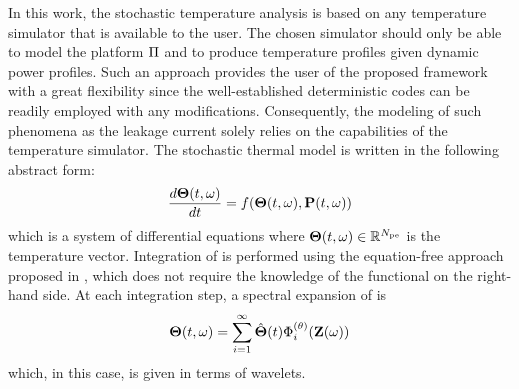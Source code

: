 In this work, the stochastic temperature analysis is based on any temperature simulator that is available to the user. The chosen simulator should only be able to model the platform $\Pi$ and to produce temperature profiles given dynamic power profiles. Such an approach provides the user of the proposed framework with a great flexibility since the well-established deterministic codes can be readily employed with any modifications. Consequently, the modeling of such phenomena as the leakage current solely relies on the capabilities of the temperature simulator. The stochastic thermal model is written in the following abstract form:
\begin{equation} \elabel{thermal-model}
  \frac{d\vT(\t, \o)}{dt} = f(\vT(\t, \o), \vPP(\t, \o))
\end{equation}
which is a system of differential equations where ${\boldsymbol\Theta}(t, \omega) \in \mathbb{R}^{N_\text{pe}}$ is the temperature vector. Integration of  is performed using the equation-free approach proposed in \cite{xiu2005}, which does not require the knowledge of the functional on the right-hand side. At each integration step, a spectral expansion of  is
\[
  {\boldsymbol\Theta}(t, \omega) = \sum_{i = 1}^\infty \hat{{\boldsymbol\Theta}}(t) \Phi^{(\theta)}_i(\mathbf{Z}(\omega))
\]
which, in this case, is given in terms of wavelets.
